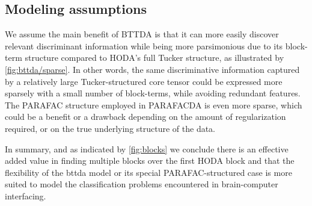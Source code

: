 \documentclass[twocolumn]{article}
\begin{document}



	\subsection{Modeling assumptions}


	We assume the main benefit of BTTDA is that it can more easily discover relevant
	discriminant information while being more parsimonious due to its
	block-term structure compared to HODA's full Tucker structure, as illustrated
	by \cref{fig:bttda/sparse}.
	In other words, the same discriminative information captured by a relatively large
	Tucker-structured core tensor could be expressed more sparsely with a small
	number of block-terms, while avoiding redundant features.
	The PARAFAC structure employed in PARAFACDA is even more sparse, which could be
	a benefit or a drawback depending on the amount of regularization required,
	or on the true underlying structure of the data.



	In summary, and as indicated by \cref{fig:blocks} we conclude there is an effective
	added value in finding multiple blocks over the first HODA block and that the flexibility of the \ac{bttda} model or its special PARAFAC-structured case is more suited to model the classification problems encountered in brain-computer interfacing.
\end{document}
